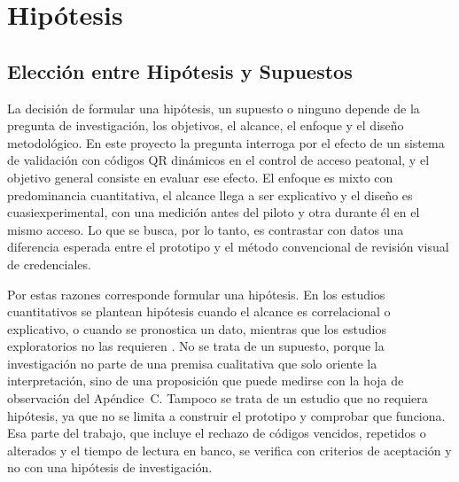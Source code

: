 \section{Hipótesis}
\let\hipsec\subsection

\hipsec{Elección entre Hipótesis y Supuestos}
La decisión de formular una hipótesis, un supuesto o ninguno depende de la
pregunta de investigación, los objetivos, el alcance, el enfoque y el diseño
metodológico. En este proyecto la pregunta interroga por el efecto de un
sistema de validación con códigos QR dinámicos en el control de acceso
peatonal, y el objetivo general consiste en evaluar ese efecto. El enfoque es
mixto con predominancia cuantitativa, el alcance llega a ser explicativo y el
diseño es cuasiexperimental, con una medición antes del piloto y otra durante
él en el mismo acceso. Lo que se busca, por lo tanto, es contrastar con datos
una diferencia esperada entre el prototipo y el método convencional de
revisión visual de credenciales.

Por estas razones corresponde formular una hipótesis. En los estudios
cuantitativos se plantean hipótesis cuando el alcance es correlacional o
explicativo, o cuando se pronostica un dato, mientras que los estudios
exploratorios no las requieren \parencite{hernandezsampieri2014metodologia}.
No se trata de un supuesto, porque la investigación no parte de una premisa
cualitativa que solo oriente la interpretación, sino de una proposición que
puede medirse con la hoja de observación del Apéndice~C. Tampoco se trata de
un estudio que no requiera hipótesis, ya que no se limita a construir el
prototipo y comprobar que funciona. Esa parte del trabajo, que incluye el
rechazo de códigos vencidos, repetidos o alterados y el tiempo de lectura en
banco, se verifica con criterios de aceptación y no con una hipótesis de
investigación.

